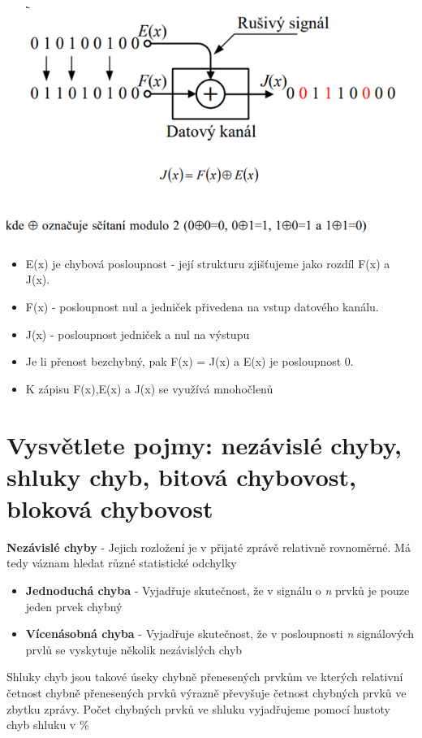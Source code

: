 \includegraphics[]{images/ručení.png}
\begin{itemize}
    \item E(x) je chybová posloupnost - její strukturu zjišťujeme jako rozdíl F(x) a J(x).
    \item F(x) - posloupnost nul a jedniček přivedena na vstup datového kanálu.
    \item J(x) - posloupnost jedniček a nul na výstupu
    \item Je li přenost bezchybný, pak F(x) = J(x) a E(x) je posloupnost 0.
    \item K zápisu F(x),E(x) a J(x) se využívá mnohočlenů
\end{itemize}
\section{Vysvětlete pojmy: nezávislé chyby, shluky chyb, bitová chybovost, bloková chybovost}
\textbf{Nezávislé chyby} - Jejich rozložení je v přijaté zprávě relativně rovnoměrné.
Má tedy váznam hledat různé statistické odchylky
\begin{itemize}
    \item \textbf{Jednoduchá chyba} - Vyjadřuje skutečnost, že v signálu o \emph{n} prvků je pouze jeden prvek chybný
    \item \textbf{Vícenásobná chyba} - Vyjadřuje skutečnost, že v posloupnosti \emph{n} signálových prvlů se vyskytuje několik nezávislých chyb
\end{itemize}

Shluky chyb jsou takové úseky chybně přenesených prvkům ve kterých relativní četnost chybně přenesených prvků výrazně převyšuje četnost chybných prvků ve zbytku zprávy.
Počet chybných prvků ve shluku vyjadřujeme pomocí hustoty chyb shluku v \%

